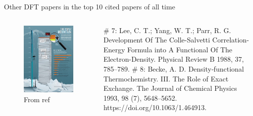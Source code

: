 \documentclass[aspectratio=169]{beamer}
\begin{document}
    \begin{frame}{Other DFT papers in the top 10 cited papers of all time}
        \begin{columns}
            \begin{figure}
                \centering
                \includegraphics[width=\linewidth]{lectures/figures/5_paper_mountain.jpg}
                \caption{From ref \cite{vannoordenTop100Papers2014}}
            \end{figure}
            \# 7: Lee, C. T.; Yang, W. T.; Parr, R. G. Development Of The Colle-Salvetti Correlation-Energy Formula into A Functional Of The Electron-Density. Physical Review B 1988, 37, 785–789.\cite{leeDevelopmentColleSalvettiCorrelationEnergy1988}\newline
            \newline
            \# 8: Becke, A. D. Density‐functional Thermochemistry. III. The Role of Exact Exchange. The Journal of Chemical Physics 1993, 98 (7), 5648–5652. https://doi.org/10.1063/1.464913.\cite{beckeDensityFunctionalThermochemistry1993}

        \end{columns}
    \end{frame}
\end{document}
